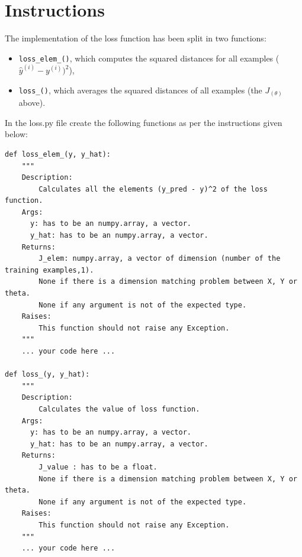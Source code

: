 \documentclass{42-en}
\begin{document}
\newpage

\section*{Instructions}
The implementation of the loss function has been split in two functions:
\begin{itemize}
  \item \texttt{loss\_elem\_()}, which computes the squared distances for all examples ($\hat{y}^{(i)} - y^{(i)})^2$),
  \item \texttt{loss\_()}, which averages the squared distances of all examples (the $J_(\theta)$ above).
\end{itemize}

In the loss.py file create the following functions as per the instructions given below:
\par
\begin{verbatim}
def loss_elem_(y, y_hat):
	"""
	Description:
		Calculates all the elements (y_pred - y)^2 of the loss function.
	Args:
      y: has to be an numpy.array, a vector.
      y_hat: has to be an numpy.array, a vector.
	Returns:
		J_elem: numpy.array, a vector of dimension (number of the training examples,1).
		None if there is a dimension matching problem between X, Y or theta.
		None if any argument is not of the expected type.
	Raises:
		This function should not raise any Exception.
	"""
	... your code here ...

def loss_(y, y_hat):
	"""
	Description:
		Calculates the value of loss function.
	Args:
      y: has to be an numpy.array, a vector.
      y_hat: has to be an numpy.array, a vector.
	Returns:
		J_value : has to be a float.
		None if there is a dimension matching problem between X, Y or theta.
		None if any argument is not of the expected type.
	Raises:
		This function should not raise any Exception.
	"""
	... your code here ...
\end{verbatim}

\end{document}
